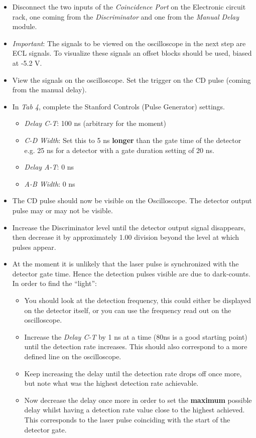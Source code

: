 \documentclass{article}
\begin{document}
\begin{itemize}
\item
Disconnect the two inputs of the \emph{Coincidence Port} on the Electronic circuit rack, one coming from the \emph{Discriminator} and one from the \emph{Manual Delay} module. 
\item
\emph{Important}: The signals to be viewed on the oscilloscope in the next step are ECL signals. To visualize these signals an offset blocks should be used, biased at -5.2 V. 
\item
View the signals on the oscilloscope. Set the trigger on the CD pulse (coming from the manual delay).

\end{itemize}
\begin{itemize}
\item 
In \emph{Tab 4}, complete the Stanford Controls (Pulse Generator) settings. 
\begin{itemize}
\item
\emph{Delay C-T}: 100 ns (arbitrary for the moment)
\item
\emph{C-D Width}: Set this to 5 ns {\bf longer} than the gate time of the detector e.g. 25 ns for a detector with a gate duration setting of 20 ns.
\item
\emph{Delay A-T}: 0 ns
\item
\emph{A-B Width}: 0 ns
\end{itemize}

\item
The CD pulse should now be visible on the Oscilloscope. The detector output pulse may or may not be visible.
\item
Increase the Discriminator level until the detector output signal disappears, then decrease it by approximately 1.00 division beyond the level at which pulses appear.
\item
At the moment it is unlikely that the laser pulse is synchronized with the detector gate time. Hence the detection pulses visible are due to dark-counts.  In order to find the ``light'':
\begin{itemize}
\item
You should look at the detection frequency, this could either be displayed on the detector itself, or you can use the frequency read out on the oscilloscope.
\item
Increase the \emph{Delay C-T} by 1 ns at a time (80ns is a good starting point) until the detection rate increases. This should also correspond to a more defined line on the oscilloscope.
\item
Keep increasing the delay until the detection rate drops off once more, but note what was the highest detection rate achievable. 
\item
Now decrease the delay once more in order to set the {\bf maximum} possible delay whilst having a detection rate value close to the highest achieved. This corresponds to the laser pulse coinciding with the start of the detector gate. 
\end{itemize}


\end{itemize}
\end{document}
